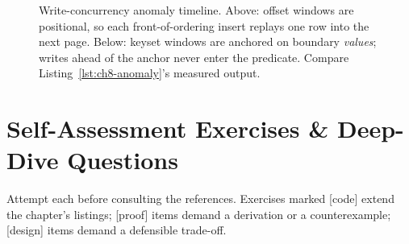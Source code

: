 \begin{figure}[h]
  \caption{Write-concurrency anomaly timeline. Above: offset windows are
           positional, so each front-of-ordering insert replays one row into
           the next page. Below: keyset windows are anchored on boundary
           \emph{values}; writes ahead of the anchor never enter the
           predicate. Compare Listing~\ref{lst:ch8-anomaly}'s measured
           output.}
  \label{fig:ch8-anomaly-timeline}
\end{figure}

\section{Self-Assessment Exercises \& Deep-Dive Questions}
\label{sec:ch8-self-assessment}

Attempt each before consulting the references. Exercises marked [code]
extend the chapter's listings; [proof] items demand a derivation or a
counterexample; [design] items demand a defensible trade-off.

